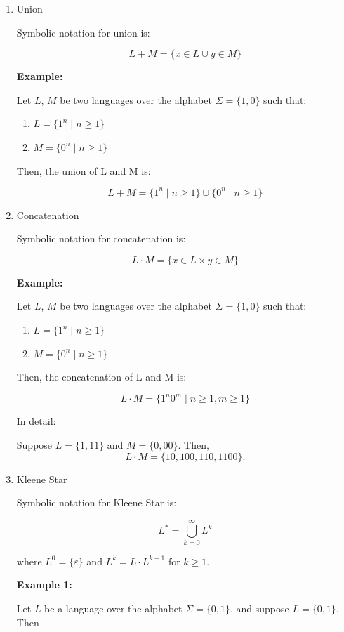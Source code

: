 \documentclass[12pt,a4paper,openany]{article}
\begin{document}
\begin{enumerate}
    \item Union
    
    Symbolic notation for union is: 

    \[L + M = \{x \in L \cup y \in M \}\] 
    
    \textbf{Example:} 

    Let $L$, $M$ be two languages over the alphabet $\Sigma = \{1, 0\}$ such that:
    \begin{enumerate}
    \item $L =  \{1^n \mid n \ge 1\}$
    \item $M =  \{0^n \mid n \ge 1\}$
    \end{enumerate}

    Then, the union of L and M is:

    \[L + M = \{1^n \mid n \ge 1\} \cup \{0^n \mid n \ge 1\}\]

    \item Concatenation
    
    Symbolic notation for concatenation is: 

    \[L \cdot M = \{x \in L \times y \in M \}\]

    \textbf{Example:}

    Let $L$, $M$ be two languages over the alphabet $\Sigma = \{1, 0\}$ such that:
    \begin{enumerate}
    \item $L =  \{1^n \mid n \ge 1\}$
    \item $M =  \{0^n \mid n \ge 1\}$
    \end{enumerate}
    
    Then, the concatenation of L and M is: 

    \[L \cdot M = \{1^n0^m \mid n \ge 1, m \ge 1\}\]

    In detail: 

    Suppose $L = \{1, 11\}$ and $M = \{0, 00\}$. Then, $$L \cdot M = \{10, 100, 110, 1100\}.$$

    \item Kleene Star
    
    Symbolic notation for Kleene Star is: 

    \[L^* = \bigcup_{k=0}^{\infty} L^k\]
    
    where $L^0 = \{\varepsilon\}$ and $L^k = L \cdot L^{k-1}$ for $k \ge 1$.

    \textbf{Example 1:}

    Let $L$ be a language over the alphabet $\Sigma=\{0,1\}$, and suppose $L=\{0,1\}$. Then


\end{enumerate}
\end{document}
